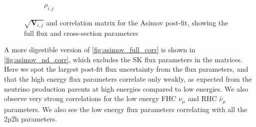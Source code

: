 \begin{figure}[h]
\begin{subfigure}[t]{0.49\textwidth}
		\caption{$\rho_{i,j}$}
	\end{subfigure}
	\caption{$\sqrt{\mathbf{V}_{i,j}}$ and correlation matrix for the Asimov post-fit, showing the full flux and cross-section parameters}
	\label{fig:asimov_full_corr}
\end{figure}

A more digestible version of \autoref{fig:asimov_full_corr} is shown in \autoref{fig:asimov_nd_corr}, which excludes the SK flux parameters in the matrices. Here we spot the largest post-fit flux uncertainty from the \nue flux parameters, and that the high energy flux parameters correlate only weakly, as expected from the neutrino production parents at high energies compared to low energies. We also observe very strong correlations for the low energy FHC $\nu_\mu$ and RHC $\bar{\nu}_\mu$ parameters. We also see the low energy flux parameters correlating with all the 2p2h parameters.
